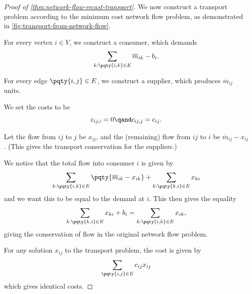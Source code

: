 \begin{proof}[Proof of \autoref{thm:network-flow-recast-transport}]
    We now construct a transport problem according to the minimum cost network flow problem, as demonstrated in \autoref{fig:transport-from-network-flow}.

    For every vertex \(i \in V\), we construct a consumer, which demands
    \[
        \sum_{k: \pqty{i, k} \in E} \overline{m}_{ik} - b_i.
    \]

    For every edge \(\pqty{i, j} \in E\), we construct a supplier, which produces \(\overline{m}_{ij}\) units.

    We set the costs to be
    \[
        c_{ij, i} = 0 \qand c_{ij, j} = c_{ij}.
    \]

    Let the flow from \(ij\) to \(j\) be \(x_{ij}\), and the (remaining) flow from \(ij\) to \(i\) be \(\overline{m}_{ij} - x_{ij}\). (This gives the transport conservation for the suppliers.)

    We notice that the total flow into consumer \(i\) is given by
    \[
        \sum_{k: \pqty{i, k} \in E} \pqty{\overline{m}_{ik} - x_{ik}} + \sum_{k: \pqty{k, i} \in E} x_{ki}
    \]
    and we want this to be equal to the demand at \(i\). This then gives the equality
    \[
        \sum_{k: \pqty{k, i} \in E} x_{ki} + b_i = \sum_{k: \pqty{i, k} \in E} x_{ik},
    \]
    giving the conservation of flow in the original network flow problem.

    For any solution \(x_{ij}\) to the transport problem, the cost is given by
    \[
        \sum_{\pqty{i, j} \in E} c_{ij} x_{ij}
    \]
    which gives identical costs.
\end{proof}

